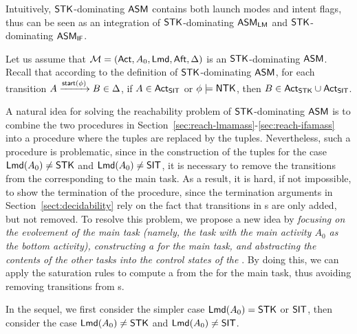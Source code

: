 
Intuitively, $\mathsf{STK}$-dominating $\textsf{ASM}$ contains both launch modes and intent flags, thus can be seen as an integration of $\mathsf{STK}$-dominating $\textsf{ASM}_\textsf{LM}$ and $\mathsf{STK}$-dominating $\textsf{ASM}_\textsf{IF}$. 

Let us assume that ${\mathcal{M} } = ({\sf Act},A_0,{\sf Lmd},{\sf Aft},\Delta)$ is an $\mathsf{STK}$-dominating $\textsf{ASM}$. Recall that according to the definition of ${\sf STK}$-dominating $\textsf{ASM}$, for each transition $A \xrightarrow{{\mathsf{start} }(\phi)} B \in \Delta$, if $A \in {\sf Act}_{\sf SIT}$ or $\phi \models {\sf NTK}$, then $B \in {\sf Act}_{\sf STK} \cup {\sf Act}_{\sf SIT}$.

A natural idea for solving the reachability problem of $\mathsf{STK}$-dominating $\textsf{ASM}$ is to combine the two procedures in Section~\ref{sec:reach-lmamass}-\ref{sec:reach-ifamass} into a procedure where the {\NFA} tuples are replaced by the {\WOTrNFA} tuples.  
Nevertheless, such a procedure is problematic, since in the construction of the {\WOTrNFA} tuples for the case ${\sf Lmd}(A_0) \neq \mathsf{STK}$ and ${\sf Lmd}(A_0) \neq \mathsf{SIT}$, it is necessary to remove the transitions from the {\WOTrNFA} corresponding to the main task. As a result, it is hard, if not impossible, to show the termination of the procedure, since the termination arguments in Section~\ref{sect:decidability} rely on the fact that transitions in {\WOTrNFA}s are only added, but not removed. 
To resolve this problem, we propose a new idea by \emph{focusing on the evolvement of the main task (namely, the task with the main activity $A_0$ as the bottom activity), constructing a {\WOTrPDS} for the main task, and abstracting the contents of the other tasks into the control states of the {\WOTrPDS}}. By doing this, we can apply the saturation rules to compute a {\WOTrNFA} from the {\WOTrPDS} for the main task, thus avoiding removing transitions from {\WOTrNFA}s.

In the sequel, we first consider the simpler case ${\sf Lmd}(A_0) = \mathsf{STK}$ or $\mathsf{SIT}$, then consider the case ${\sf Lmd}(A_0) \neq \mathsf{STK}$ and ${\sf Lmd}(A_0) \neq \mathsf{SIT}$.


